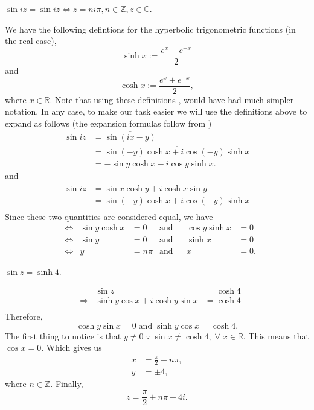 \documentclass[12pt]{book}
\begin{document}
\begin{exmp}
    $\sin i\overline{z} = \overline{\sin iz} \iff z = ni\pi, n \in \mathbb{Z}, z \in \mathbb{C}.$
\end{exmp}
We have the following defintions for the hyperbolic trigonometric functions (in the real case),
\[
    \sinh x := \frac{e^{x} - e^{-x}}{2}
\]
and
\[
    \cosh x := \frac{e^{x} + e^{-x}}{2},
\]
where $x \in \mathbb{R}.$ Note that using these definitions , would have had much simpler notation. In any case, to make our task easier we will use the definitions above to expand as follows (the expansion formulas follow from )
\begin{align*}
    \overline{\sin iz}
        &=
            \overline{\sin (ix - y)} \\
        &=
            \overline{\sin (-y)\cosh x + i \cos(-y)\sinh x} \\
        &=
            -\sin y \cosh x - i \cos y \sinh x.
\end{align*}
and
\begin{align*}
    \sin \overline{iz}
        &=
            \sin x\cosh y + i \cosh x\sin y \\
        &=
            \sin (-y)\cosh x + i \cos(-y)\sinh x \\
\end{align*}
Since these two quantities are considered equal, we have
\begin{align*}
    &\iff   &\sin y \cosh x &=  0       &\text{and}&     &\cos y \sinh x &= 0     \\
    &\iff   &\sin y         &=  0       &\text{and}&     &\sinh x        &= 0     \\
    &\iff   &y              &=  n\pi    &\text{and}&     &x              &= 0.
\end{align*}

\begin{exmp}
    $\sin z = \sinh 4.$
\end{exmp}
\begin{align*}
    &&\sin z 
        &= \cosh 4 \\
    &\Rightarrow &\sinh y\cos x + i \cosh y\sin x
        &= 
            \cosh 4 \\
\end{align*}
Therefore,
\[
    \cosh y\sin x  = 0 \;\text{and}\; \sinh y\cos x = \cosh 4.
\]
The first thing to notice is that $y \neq 0 \;\because\; \sin x \neq \cosh 4, \;\forall\; x \in \mathbb{R}.$ This means that $\cos x = 0.$ Which gives us
\begin{align*}
    x
        &=
            \frac{\pi}{2} + n\pi, \\
    y
        &=
            \pm 4,
\end{align*}
where $n \in \mathbb{Z}.$ Finally,
\[
    z = \frac{\pi}{2} + n\pi \pm 4i. 
\]
\end{document}
